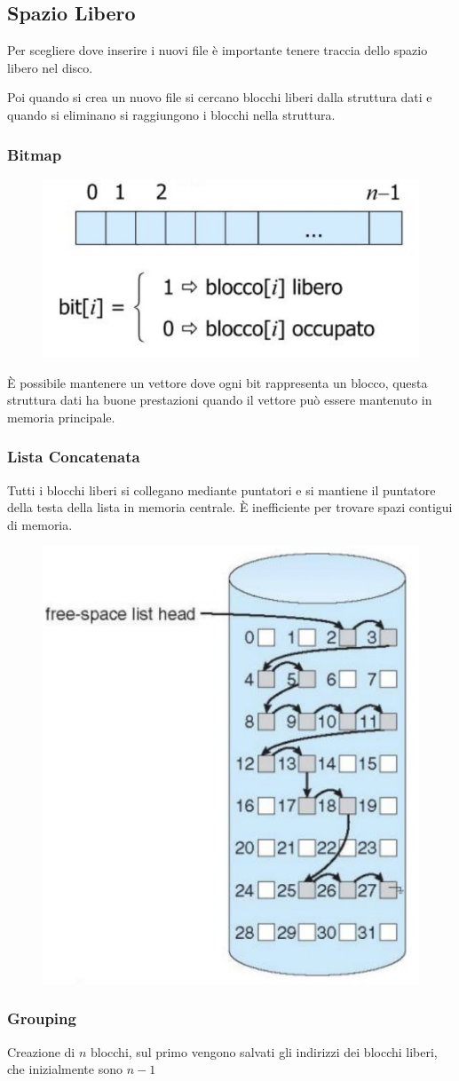 \subsection{Spazio Libero}
Per scegliere dove inserire i nuovi file è importante tenere traccia dello spazio libero nel disco.

Poi quando si crea un nuovo file si cercano blocchi liberi dalla struttura dati e quando si eliminano si raggiungono i blocchi nella struttura.

\subsubsection{Bitmap}
\begin{figure}[H]
    \centering
    \includegraphics[width=0.4\linewidth]{assets/bitmap-libero.jpeg}
\end{figure}

È possibile mantenere un vettore dove ogni bit rappresenta un blocco, questa struttura dati ha buone prestazioni quando il vettore può essere mantenuto in memoria principale.

\subsubsection{Lista Concatenata}
Tutti i blocchi liberi si collegano mediante puntatori e si mantiene il puntatore della testa della lista in memoria centrale. È inefficiente per trovare spazi contigui di memoria.

\begin{figure}[H]
    \centering
    \includegraphics[width=0.3\linewidth]{assets/spazio-libero-lista-concatenata.jpg}
\end{figure}


\subsubsection{Grouping}
Creazione di $n$ blocchi, sul primo vengono salvati gli indirizzi dei blocchi liberi, che inizialmente sono $n-1$

